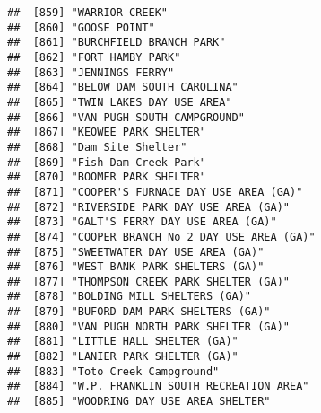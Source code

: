 \documentclass[
]{article}
\begin{document}
\begin{verbatim}
##  [859] "WARRIOR CREEK"                                                                       
##  [860] "GOOSE POINT"                                                                         
##  [861] "BURCHFIELD BRANCH PARK"                                                              
##  [862] "FORT HAMBY PARK"                                                                     
##  [863] "JENNINGS FERRY"                                                                      
##  [864] "BELOW DAM SOUTH CAROLINA"                                                            
##  [865] "TWIN LAKES DAY USE AREA"                                                             
##  [866] "VAN PUGH SOUTH CAMPGROUND"                                                           
##  [867] "KEOWEE PARK SHELTER"                                                                 
##  [868] "Dam Site Shelter"                                                                    
##  [869] "Fish Dam Creek Park"                                                                 
##  [870] "BOOMER PARK SHELTER"                                                                 
##  [871] "COOPER'S FURNACE DAY USE AREA (GA)"                                                  
##  [872] "RIVERSIDE PARK DAY USE AREA (GA)"                                                    
##  [873] "GALT'S FERRY DAY USE AREA (GA)"                                                      
##  [874] "COOPER BRANCH No 2 DAY USE AREA (GA)"                                                
##  [875] "SWEETWATER DAY USE AREA (GA)"                                                        
##  [876] "WEST BANK PARK SHELTERS (GA)"                                                        
##  [877] "THOMPSON CREEK PARK SHELTER (GA)"                                                    
##  [878] "BOLDING MILL SHELTERS (GA)"                                                          
##  [879] "BUFORD DAM PARK SHELTERS (GA)"                                                       
##  [880] "VAN PUGH NORTH PARK SHELTER (GA)"                                                    
##  [881] "LITTLE HALL SHELTER (GA)"                                                            
##  [882] "LANIER PARK SHELTER (GA)"                                                            
##  [883] "Toto Creek Campground"                                                               
##  [884] "W.P. FRANKLIN SOUTH RECREATION AREA"                                                 
##  [885] "WOODRING DAY USE AREA SHELTER"                                                       

\end{verbatim}
\end{document}
